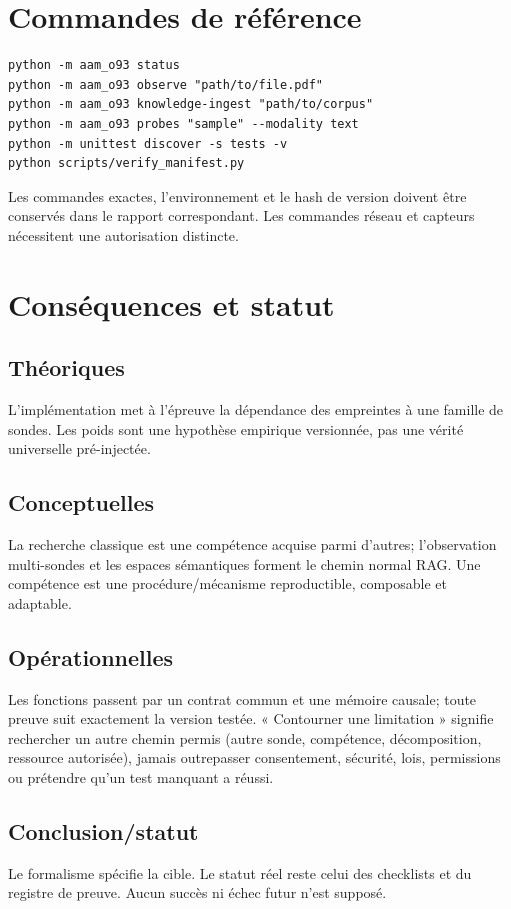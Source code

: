 \documentclass[11pt,a4paper]{report}
\begin{document}
\chapter{Commandes de référence}
\begin{lstlisting}
python -m aam_o93 status
python -m aam_o93 observe "path/to/file.pdf"
python -m aam_o93 knowledge-ingest "path/to/corpus"
python -m aam_o93 probes "sample" --modality text
python -m unittest discover -s tests -v
python scripts/verify_manifest.py
\end{lstlisting}
Les commandes exactes, l'environnement et le hash de version doivent être conservés dans le rapport correspondant. Les commandes réseau et capteurs nécessitent une autorisation distincte.
\chapter{Conséquences et statut}
\section{Théoriques}L'implémentation met à l'épreuve la dépendance des empreintes à une famille de sondes. Les poids sont une hypothèse empirique versionnée, pas une vérité universelle pré-injectée.\section{Conceptuelles}La recherche classique est une compétence acquise parmi d'autres; l'observation multi-sondes et les espaces sémantiques forment le chemin normal RAG. Une compétence est une procédure/mécanisme reproductible, composable et adaptable.\section{Opérationnelles}Les fonctions passent par un contrat commun et une mémoire causale; toute preuve suit exactement la version testée. « Contourner une limitation » signifie rechercher un autre chemin permis (autre sonde, compétence, décomposition, ressource autorisée), jamais outrepasser consentement, sécurité, lois, permissions ou prétendre qu'un test manquant a réussi.\section{Conclusion/statut}Le formalisme spécifie la cible. Le statut réel reste celui des checklists et du registre de preuve. Aucun succès ni échec futur n'est supposé.
\end{document}
